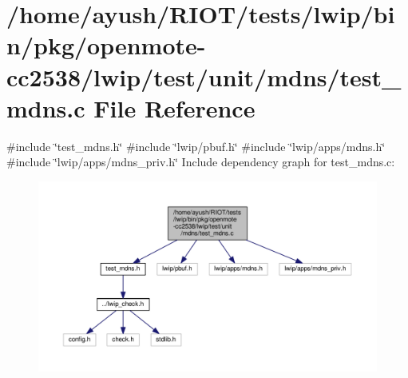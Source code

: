 \hypertarget{openmote-cc2538_2lwip_2test_2unit_2mdns_2test__mdns_8c}{}\section{/home/ayush/\+R\+I\+O\+T/tests/lwip/bin/pkg/openmote-\/cc2538/lwip/test/unit/mdns/test\+\_\+mdns.c File Reference}
\label{openmote-cc2538_2lwip_2test_2unit_2mdns_2test__mdns_8c}
{\ttfamily \#include \char`\"{}test\+\_\+mdns.\+h\char`\"{}}\newline
{\ttfamily \#include \char`\"{}lwip/pbuf.\+h\char`\"{}}\newline
{\ttfamily \#include \char`\"{}lwip/apps/mdns.\+h\char`\"{}}\newline
{\ttfamily \#include \char`\"{}lwip/apps/mdns\+\_\+priv.\+h\char`\"{}}\newline
Include dependency graph for test\+\_\+mdns.\+c\+:
\nopagebreak
\begin{figure}[H]
\begin{center}
\leavevmode
\includegraphics[width=350pt]{openmote-cc2538_2lwip_2test_2unit_2mdns_2test__mdns_8c__incl}
\end{center}
\end{figure}
